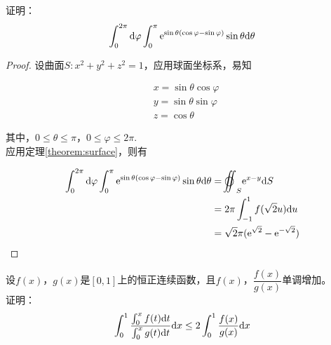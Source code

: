 \begin{proposition}

    证明：\[\int_{0}^{2\pi}\mathrm{d} \varphi \int_{0}^{\pi}{\mathrm{e}^{\sin{\theta}(\cos{\varphi} - \sin{\varphi})}\sin{\theta}}\mathrm{d} \theta\]

\end{proposition}

\begin{proof}

    设曲面$S: x^2 + y^2 + z^2 = 1$，应用球面坐标系，易知

    \begin{align*}
        &x = \sin{\theta} \cos{\varphi} \\
        &y = \sin{\theta} \sin{\varphi} \\
        &z = \cos{\theta}         
    \end{align*}

    其中，$0 \leq \theta \leq \pi$，$0 \leq \varphi \leq 2\pi$. \\
    应用定理\ref{theorem:surface}，则有

    \begin{align*}
        \int_{0}^{2\pi}\diff \varphi \int_{0}^{\pi}{\euler^{\sin{\theta}(\cos{\varphi} - \sin{\varphi})}\sin{\theta}}\diff \theta & = \ooint_{S}{\euler^{x - y}}\diff S \\
        & = 2\pi \int_{-1}^{1}{f(\sqrt{2}u)}\diff u \\
        & = \sqrt{2}\pi(\euler^{\sqrt{2}} - \euler^{-\sqrt{2}})
    \end{align*}

\end{proof}

\begin{proposition}

    设$f(x)$，$g(x)$是$[0, 1]$上的恒正连续函数，且$f(x)$，$\dfrac{f(x)}{g(x)}$单调增加。\\
    证明：
    \[\int_{0}^{1}{\dfrac{\int_{0}^{x}{f(t)}\mathrm{d} t}{\int_{0}^{x}{g(t)}\mathrm{d} t}}\mathrm{d} x \leq 2\int_{0}^{1}{\dfrac{f(x)}{g(x)}}\mathrm{d} x\]

\end{proposition}

